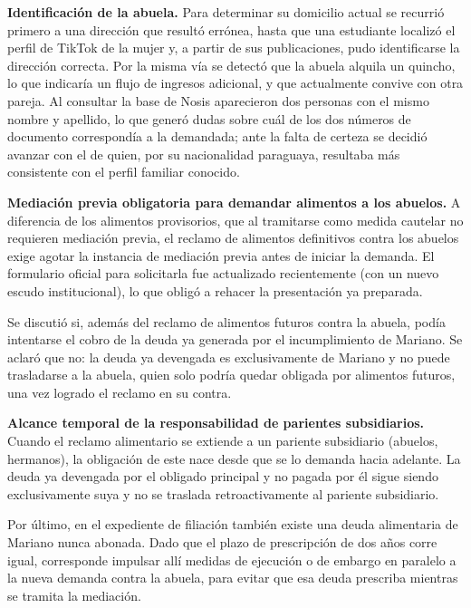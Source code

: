 \documentclass[12pt,oneside]{book}
\begin{document}
\textbf{Identificación de la abuela.} Para determinar su domicilio actual se recurrió primero a una dirección que resultó errónea, hasta que una estudiante localizó el perfil de TikTok de la mujer y, a partir de sus publicaciones, pudo identificarse la dirección correcta. Por la misma vía se detectó que la abuela alquila un quincho, lo que indicaría un flujo de ingresos adicional, y que actualmente convive con otra pareja. Al consultar la base de Nosis aparecieron dos personas con el mismo nombre y apellido, lo que generó dudas sobre cuál de los dos números de documento correspondía a la demandada; ante la falta de certeza se decidió avanzar con el de quien, por su nacionalidad paraguaya, resultaba más consistente con el perfil familiar conocido.

\begin{important}
\textbf{Mediación previa obligatoria para demandar alimentos a los abuelos.} A diferencia de los alimentos provisorios, que al tramitarse como medida cautelar no requieren mediación previa, el reclamo de alimentos definitivos contra los abuelos exige agotar la instancia de mediación previa antes de iniciar la demanda. El formulario oficial para solicitarla fue actualizado recientemente (con un nuevo escudo institucional), lo que obligó a rehacer la presentación ya preparada.
\end{important}

Se discutió si, además del reclamo de alimentos futuros contra la abuela, podía intentarse el cobro de la deuda ya generada por el incumplimiento de Mariano. Se aclaró que no: la deuda ya devengada es exclusivamente de Mariano y no puede trasladarse a la abuela, quien solo podría quedar obligada por alimentos futuros, una vez logrado el reclamo en su contra.

\begin{important}
\textbf{Alcance temporal de la responsabilidad de parientes subsidiarios.} Cuando el reclamo alimentario se extiende a un pariente subsidiario (abuelos, hermanos), la obligación de este nace desde que se lo demanda hacia adelante. La deuda ya devengada por el obligado principal y no pagada por él sigue siendo exclusivamente suya y no se traslada retroactivamente al pariente subsidiario.
\end{important}

Por último, en el expediente de filiación también existe una deuda alimentaria de Mariano nunca abonada. Dado que el plazo de prescripción de dos años corre igual, corresponde impulsar allí medidas de ejecución o de embargo en paralelo a la nueva demanda contra la abuela, para evitar que esa deuda prescriba mientras se tramita la mediación.
\end{document}
